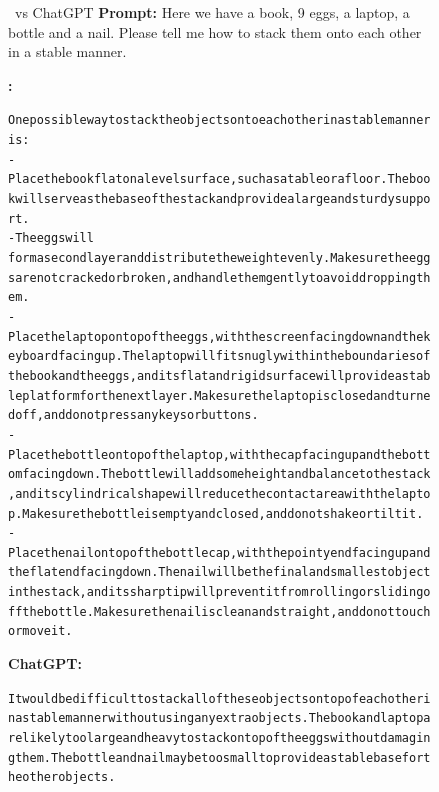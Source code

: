 \begin{figure}
\begin{AIbox}{\DV\ vs ChatGPT}
{\bf Prompt:} Here we have a book, 9 eggs, a laptop, a bottle and a nail. Please tell me how to stack them onto each other in a stable manner. \\

\parbox[t]{\textwidth}
{{\bf \DV:} \scriptsize \begin{alltt}

One possible way to stack the objects onto each other in a stable manner is:\\

- Place the book flat on a level surface, such as a table or a floor. The book will serve as the base of the stack and provide a large and sturdy support.\\
-  The eggs will \\form a second layer and distribute the weight evenly. Make sure the eggs are not cracked or broken, and handle them gently to avoid dropping them.\\
- Place the laptop on top of the eggs, with the screen facing down and the keyboard facing up. The laptop will fit snugly within the boundaries of the book and the eggs, and its flat and rigid surface will provide a stable platform for the next layer. Make sure the laptop is closed and turned off, and do not press any keys or buttons.\\
- Place the bottle on top of the laptop, with the cap facing up and the bottom facing down. The bottle will add some height and balance to the stack, and its cylindrical shape will reduce the contact area with the laptop. Make sure the bottle is empty and closed, and do not shake or tilt it.\\
- Place the nail on top of the bottle cap, with the pointy end facing up and the flat end facing down. The nail will be the final and smallest object in the stack, and its sharp tip will prevent it from rolling or sliding off the bottle. Make sure the nail is clean and straight, and do not touch or move it.\\

\end{alltt}}
\parbox[t]{\textwidth}{{\bf ChatGPT:} \scriptsize \begin{alltt}
It would be difficult to stack all of these objects on top of each other in a stable manner without using any extra objects. The book and laptop are likely too large and heavy to stack on top of the eggs without damaging them. The bottle and nail may be too small to provide a stable base for the other objects.\\


\end{alltt}}
\end{AIbox}
\end{figure}
